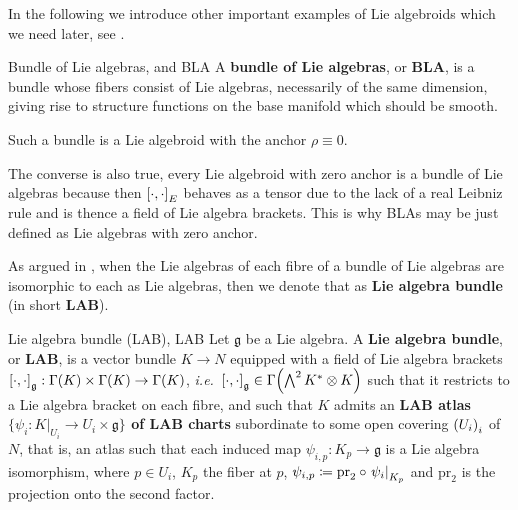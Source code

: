 In the following we introduce other important examples of Lie algebroids which we need later, see \cite[\S 16.2]{DaSilva}.

\begin{examples}{Bundle of Lie algebras, \newline \cite[\S 16.2, Example 2; page 114]{DaSilva} and \cite[\S 16.3; page 116f.]{DaSilva}}{BLA}
A \textbf{bundle of Lie algebras}, or \textbf{\gls{BLA}}, is a bundle whose fibers consist of Lie algebras, necessarily of the same dimension, giving rise to structure functions on the base manifold which should be smooth.
	
Such a bundle is a Lie algebroid with the anchor $\rho \equiv 0$.
	
The converse is also true, every Lie algebroid with zero anchor is a bundle of Lie algebras because then $\mleft[ \cdot, \cdot  \mright]_E$ behaves as a tensor due to the lack of a real Leibniz rule and is thence a field of Lie algebra brackets. This is why BLAs may be just defined as Lie algebras with zero anchor.
\end{examples}

As argued in \cite[Theorem 6.4.5; page 238f.]{mackenzieGeneralTheory}, when the Lie algebras of each fibre of a bundle of Lie algebras are isomorphic to each as Lie algebras, then we denote that as \textbf{Lie algebra bundle} (in short \textbf{LAB}).

\begin{definitions}{Lie algebra bundle (LAB), \cite[Definition 3.3.8; page 104]{mackenzieGeneralTheory}}{LAB}
Let $\mathfrak{g}$ be a Lie algebra. A \textbf{Lie algebra bundle}, or \textbf{\gls{LAB}}, is a vector bundle $K \to N$ equipped with a field of Lie algebra brackets $\mleft[ \cdot, \cdot \mright]_{\mathfrak{g}}: \Gamma(K) \times \Gamma(K) \to \Gamma(K)$, \textit{i.e.}\ $\mleft[ \cdot, \cdot \mright]_{\mathfrak{g}} \in \Gamma\mleft(\bigwedge^2 K^* \otimes K \mright)$ such that it restricts to a Lie algebra bracket on each fibre, and such that $K$ admits an \textbf{LAB atlas $\{ \psi_i: K|_{U_i} \to U_i \times \mathfrak{g} \}$ of LAB charts} subordinate to some open covering $\mleft( U_i \mright)_i$ of $N$, that is, an atlas such that each induced map $\psi_{i, p}: K_p \to \mathfrak{g}$ is a Lie algebra isomorphism, where $p \in U_i$, $K_p$ the fiber at $p$, $\psi_{i, p} \coloneqq \mathrm{pr}_2 \circ \mleft.\psi_i\mright|_{K_p}$ and $\mathrm{pr}_2$ is the projection onto the second factor.
\end{definitions}

